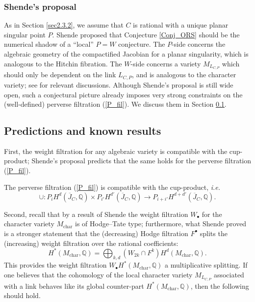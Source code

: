 \documentclass{pspum-l}
\theoremstyle{plain}
\theoremstyle{definition}
\theoremstyle{remark}
\newcommand{\BQ}{{\mathbb{Q}}}
\begin{document}
\subsubsection{Shende's proposal}
As in Section \ref{sec2.3.2}, we assume that $C$ is rational with a unique planar singular point $P$. Shende proposed that Conjecture \ref{Conj_ORS} should be the numerical shadow of a ``local'' $P=W$ conjecture. The $P$-side concerns the algebraic geometry of the compactified Jacobian for a planar singularity, which is analogous to the Hitchin fibration. The $W$-side concerns a variety $M_{L_{C,P}}$ which should only be dependent on the link $L_{C,P}$, and is analogous to the character variety; see \cite{Trinh, Trinh2, BBAMY} for relevant discussions. Although Shende's proposal is still wide open, such a conjectural picture already imposes very strong constraints on the (well-defined) perverse filtration (\ref{P_fil}). We discuss them in Section \ref{decomp_?}.






\subsection{Predictions and known results}\label{decomp_?} 

First, the weight filtration for any algebraic variety is compatible with the cup-product; Shende's proposal predicts that the same holds for the perverse filtration (\ref{P_fil}). 

\medskip

 The perverse filtration (\ref{P_fil}) is compatible with the cup-product, \emph{i.e.}
\[
\cup: P_iH^d(\overline{J}_C, \BQ) \times P_{i'}H^{d'}(\overline{J}_C, \BQ) \to P_{i+i'} H^{d+d'}(\overline{J}_C, \BQ).
\]
\medskip

Second, recall that by a result of Shende \cite[Corollary 1]{Shende} the weight filtration $W_\bullet$ for the character variety $M_{\mathrm{char}}$ is of Hodge--Tate type; furthermore, what Shende proved is a stronger statement that the (decreasing) Hodge filtration $F^\bullet$ splits the (increasing) weight filtration over the rational coefficients:
\[
H^*(M_\mathrm{char}, \BQ) = \bigoplus_{k,d} \left(W_{2k} \cap F^k \right) H^d(M_{\mathrm{char}}, \BQ).
\]
This provides the weight filtration $W_\bullet H^*(M_{\mathrm{char}}, \BQ)$ a multiplicative splitting. If one believes that the cohomology of the local character variety $M_{L_{C,P}}$ associated with a link behaves like its global counter-part $H^*(M_{\mathrm{char}}, \BQ)$, then the following should hold.
\end{document}
